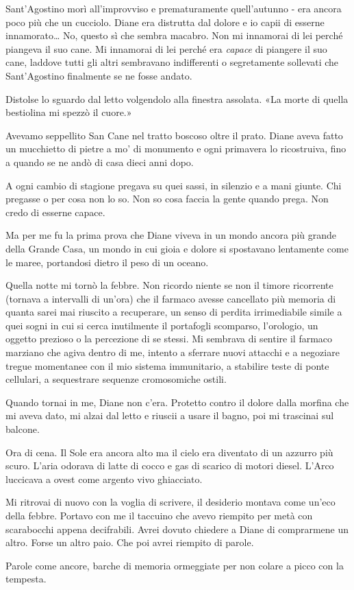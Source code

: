 Sant'Agostino morì all'improvviso e prematuramente quell'autunno - era
ancora poco più che un cucciolo. Diane era distrutta dal dolore e io
capii di esserne innamorato\ldots{} No, questo sì che sembra macabro.
Non mi innamorai di lei perché piangeva il suo cane. Mi innamorai di lei
perché era \emph{capace} di piangere il suo cane, laddove tutti gli
altri sembravano indifferenti o segretamente sollevati che Sant'Agostino
finalmente se ne fosse andato.

Distolse lo sguardo dal letto volgendolo alla finestra assolata. «La
morte di quella bestiolina mi spezzò il cuore.»

Avevamo seppellito San Cane nel tratto boscoso oltre il prato. Diane
aveva fatto un mucchietto di pietre a mo' di monumento e ogni primavera
lo ricostruiva, fino a quando se ne andò di casa dieci anni dopo.

A ogni cambio di stagione pregava su quei sassi, in silenzio e a mani
giunte. Chi pregasse o per cosa non lo so. Non so cosa faccia la gente
quando prega. Non credo di esserne capace.

Ma per me fu la prima prova che Diane viveva in un mondo ancora più
grande della Grande Casa, un mondo in cui gioia e dolore si spostavano
lentamente come le maree, portandosi dietro il peso di un oceano.

\separatorefiori

Quella notte mi tornò la febbre. Non ricordo niente se non il timore
ricorrente (tornava a intervalli di un'ora) che il farmaco avesse
cancellato più memoria di quanta sarei mai riuscito a recuperare, un
senso di perdita irrimediabile simile a quei sogni in cui si cerca
inutilmente il portafogli scomparso, l'orologio, un oggetto prezioso o
la percezione di se stessi. Mi sembrava di sentire il farmaco marziano
che agiva dentro di me, intento a sferrare nuovi attacchi e a negoziare
tregue momentanee con il mio sistema immunitario, a stabilire teste di
ponte cellulari, a sequestrare sequenze cromosomiche ostili.

Quando tornai in me, Diane non c'era. Protetto contro il dolore dalla
morfina che mi aveva dato, mi alzai dal letto e riuscii a usare il
bagno, poi mi trascinai sul balcone.

Ora di cena. Il Sole era ancora alto ma il cielo era diventato di un
azzurro più scuro. L'aria odorava di latte di cocco e gas di scarico di
motori diesel. L'Arco luccicava a ovest come argento vivo ghiacciato.

Mi ritrovai di nuovo con la voglia di scrivere, il desiderio montava
come un'eco della febbre. Portavo con me il taccuino che avevo riempito
per metà con scarabocchi appena decifrabili. Avrei dovuto chiedere a
Diane di comprarmene un altro. Forse un altro paio. Che poi avrei
riempito di parole.

Parole come ancore, barche di memoria ormeggiate per non colare a picco
con la tempesta.
